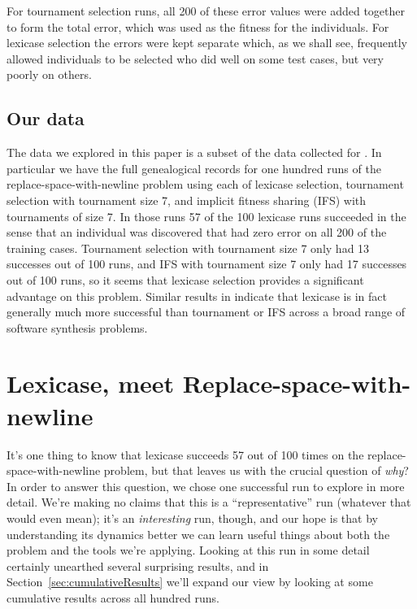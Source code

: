 For tournament selection runs, all 200 of these error values were added together to form the
total error, which was used as the fitness for the individuals. For lexicase selection the errors
were kept separate which, as we shall see, frequently allowed individuals to be selected who did 
well on some test cases, but very poorly on others.

\subsection{Our data}
\label{sec:ourData}

The data we explored in this paper is a subset of the data collected for \citep{Helmuth:2015:GPTP}. In particular
we have the full genealogical records for one hundred runs of the replace-space-with-newline problem using each 
of lexicase selection, tournament
selection with tournament size 7, and implicit fitness sharing (IFS) with tournaments of size 7. In those
runs 57 of the 100 lexicase runs succeeded in the sense that an individual was discovered that had zero
error on all 200 of the training cases. Tournament selection with tournament size 7 only
had 13 successes out of 100 runs, and IFS with tournament size 7 only had 17 successes out of 100 runs, so it seems that
lexicase selection provides a significant advantage on this problem. Similar results in \citep{Helmuth:2015:GECCO}
indicate that lexicase is in fact generally much more successful than tournament or IFS across a broad range of
software synthesis problems.

\section{Lexicase, meet Replace-space-with-newline}
\label{sec:lexicaseRun}


It's one thing to know that lexicase succeeds 57 out of 100 times on the replace-space-with-newline problem, but that
leaves us with the crucial question of \emph{why}? In order to answer this question, we chose one successful 
run to explore in more detail.
We're making no claims that this is a ``representative'' run (whatever that would even
mean); it's an \emph{interesting} run, though, and our hope is that by understanding its dynamics
better we can learn useful things about both the problem and the tools we're applying. Looking at this run in some
detail certainly unearthed several surprising results, and in Section~\ref{sec:cumulativeResults}
we'll expand our view by looking at some cumulative results across all hundred runs.

